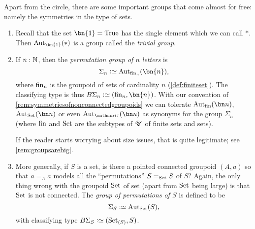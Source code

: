 \begin{example}\label{ex:groups}
  Apart from the circle, there are some important groups that come almost for free: namely the symmetries in the type of sets.
  \begin{enumerate}
  \item Recall that the set $\bn{1} =\true$ has the single element which we can call $*$. Then $\aut_{\bn{1} }(*)$ is a group called the \emph{trivial group}.
  \item If $n:\mathbb{N}$, then the \emph{permutation group of $n$ letters} is 
$$\Sigma_n\defequi\aut_{\fin_n}(\bn{n} ),$$ 
where $\fin_n$ is the groupoid of sets of cardinality $n$ (\cf \ref{def:finiteset}).  
The classifying type is thus $B\Sigma_n\defequi (\fin_n,\bn{n})$.
With our convention of \cref{rem:symmetriesofnonconnectedgroupoids} we can tolerate $\aut_{\fin}(\bn n)$, $\aut_{\Set}(\bn n)$ or even $\aut_{\UU}(\bn n)$ as synonyms for the group $\Sigma_n$ (where $\fin$ and $\mathrm{Set}$ are the subtypes of ${\mathscr{U}}$ of finite sets and sets).  

If the reader starts worrying about size issues, that is quite legitimate; see \cref{rem:groupsarebig}.
  \item More generally, if $S$ is a set, is there a pointed connected groupoid $(A,a)$ so that $a=_Aa$ models all the ``permutations'' $S=_{\mathrm{Set}}S$ of $S$?  Again, the only thing wrong with the groupoid $\mathrm{Set}$ of set (apart from $\mathrm{Set}$ being large) is that $\mathrm{Set}$ is not connected. 
%
 The \emph{group of permutations of $S$} is defined to be 
$$\Sigma_{S}\defequi\aut_{\Set}(S),$$  
with classifying type $B\Sigma_S\defequi(\conncomp \Set S,S)$.
  \end{enumerate}
\end{example}

